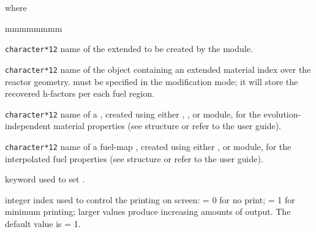 \noindent where
\begin{ListeDeDescription}{mmmmmmmm}

\item[\dusa{MACRO2}] \texttt{character*12} name of the extended
 to be created by the module.

\item[\dusa{MATEX}] \texttt{character*12} name of the 
object containing an extended material index over the reactor geometry.
 must be specified in the modification mode; it will store
the recovered h-factors per each fuel region.

\item[\dusa{MACRO}] \texttt{character*12} name of a , created
using either , ,  or  module, for the evolution-independent
material properties (see structure  or refer to the user guide\cite{dragon}).

\item[\dusa{MACFL}] \texttt{character*12} name of a fuel-map ,
created using either ,  or  module, for the interpolated fuel
properties (see structure  or refer to the user guide\cite{dragon}).

\item[\moc{EDIT}] keyword used to set .

\item[\dusa{iprint}] integer index used to control the printing on screen: = 0 for
no print; = 1 for minimum printing; larger values produce increasing amounts of
output. The default value is  = 1.

\end{ListeDeDescription}
\clearpage
